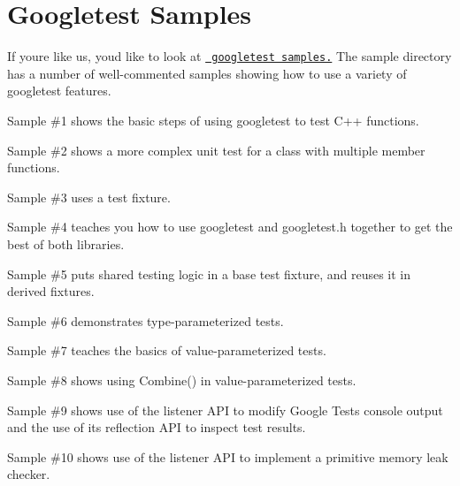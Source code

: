 \chapter{Googletest Samples}
\hypertarget{md_build_2__deps_2googletest-src_2docs_2samples}{}\label{md_build_2__deps_2googletest-src_2docs_2samples}
\label{md_build_2__deps_2googletest-src_2docs_2samples_autotoc_md376}%
%


If you\textquotesingle{}re like us, you\textquotesingle{}d like to look at \href{https://github.com/google/googletest/tree/master/googletest/samples}{\texttt{ googletest samples.}} The sample directory has a number of well-\/commented samples showing how to use a variety of googletest features.


\begin{DoxyItemize}
\item Sample \#1 shows the basic steps of using googletest to test C++ functions.
\item Sample \#2 shows a more complex unit test for a class with multiple member functions.
\item Sample \#3 uses a test fixture.
\item Sample \#4 teaches you how to use googletest and {\ttfamily googletest.\+h} together to get the best of both libraries.
\item Sample \#5 puts shared testing logic in a base test fixture, and reuses it in derived fixtures.
\item Sample \#6 demonstrates type-\/parameterized tests.
\item Sample \#7 teaches the basics of value-\/parameterized tests.
\item Sample \#8 shows using {\ttfamily Combine()} in value-\/parameterized tests.
\item Sample \#9 shows use of the listener API to modify Google Test\textquotesingle{}s console output and the use of its reflection API to inspect test results.
\item Sample \#10 shows use of the listener API to implement a primitive memory leak checker. 
\end{DoxyItemize}
